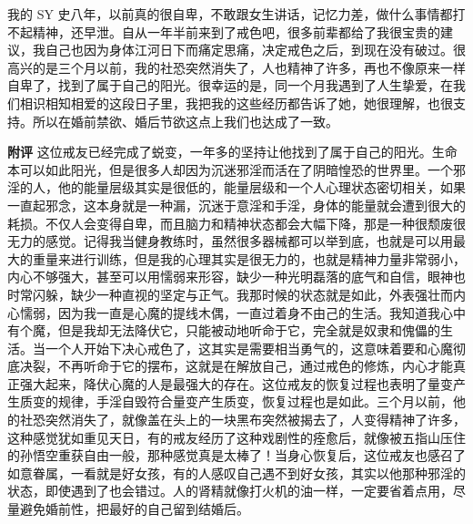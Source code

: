 \begin{case}
    我的 SY 史八年，以前真的很自卑，不敢跟女生讲话，记忆力差，做什么事情都打不起精神，还早泄。自从一年半前来到了戒色吧，很多前辈都给了我很宝贵的建议，我自己也因为身体江河日下而痛定思痛，决定戒色之后，到现在没有破过。很高兴的是三个月以前，我的社恐突然消失了，人也精神了许多，再也不像原来一样自卑了，找到了属于自己的阳光。很幸运的是，同一个月我遇到了人生挚爱，在我们相识相知相爱的这段日子里，我把我的这些经历都告诉了她，她很理解，也很支持。所以在婚前禁欲、婚后节欲这点上我们也达成了一致。

    \textbf{附评} 这位戒友已经完成了蜕变，一年多的坚持让他找到了属于自己的阳光。生命本可以如此阳光，但是很多人却因为沉迷邪淫而活在了阴暗惶恐的世界里。一个邪淫的人，他的能量层级其实是很低的，能量层级和一个人心理状态密切相关，如果一直起邪念，这本身就是一种漏，沉迷于意淫和手淫，身体的能量就会遭到很大的耗损。不仅人会变得自卑，而且脑力和精神状态都会大幅下降，那是一种很颓废很无力的感觉。记得我当健身教练时，虽然很多器械都可以举到底，也就是可以用最大的重量来进行训练，但是我的心理其实是很无力的，也就是精神力量非常弱小，内心不够强大，甚至可以用懦弱来形容，缺少一种光明磊落的底气和自信，眼神也时常闪躲，缺少一种直视的坚定与正气。我那时候的状态就是如此，外表强壮而内心懦弱，因为我一直是心魔的提线木偶，一直过着身不由己的生活。我知道我心中有个魔，但是我却无法降伏它，只能被动地听命于它，完全就是奴隶和傀儡的生活。当一个人开始下决心戒色了，这其实是需要相当勇气的，这意味着要和心魔彻底决裂，不再听命于它的摆布，这就是在解放自己，通过戒色的修炼，内心才能真正强大起来，降伏心魔的人是最强大的存在。这位戒友的恢复过程也表明了量变产生质变的规律，手淫自毁符合量变产生质变，恢复过程也是如此。三个月以前，他的社恐突然消失了，就像盖在头上的一块黑布突然被揭去了，人变得精神了许多，这种感觉犹如重见天日，有的戒友经历了这种戏剧性的痊愈后，就像被五指山压住的孙悟空重获自由一般，那种感觉真是太棒了！当身心恢复后，这位戒友也感召了如意眷属，一看就是好女孩，有的人感叹自己遇不到好女孩，其实以他那种邪淫的状态，即使遇到了也会错过。人的肾精就像打火机的油一样，一定要省着点用，尽量避免婚前性，把最好的自己留到结婚后。
\end{case}

